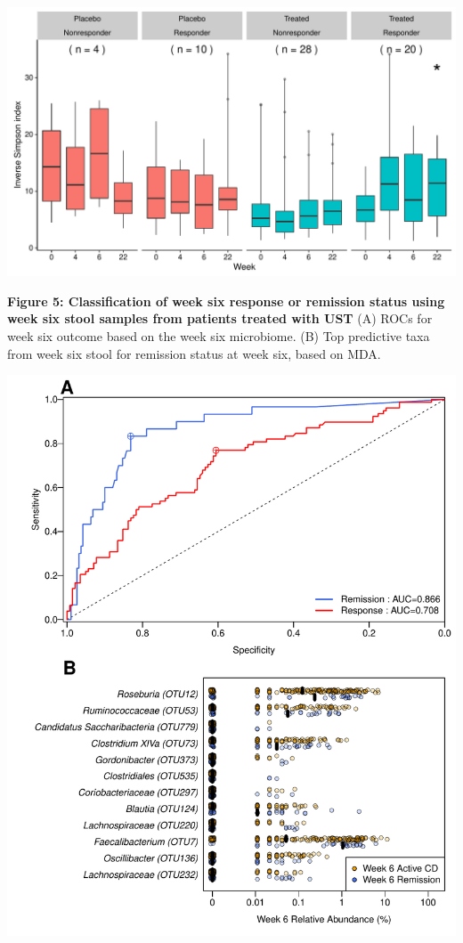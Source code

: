 \documentclass[11pt,]{article}
\begin{document}
\includegraphics{figures/Figure4_alltp.adivXvisitXindtrtXrelRSPwk22.pdf}

\newpage

\textbf{Figure 5: Classification of week six response or remission
status using week six stool samples from patients treated with UST} (A)
ROCs for week six outcome based on the week six microbiome. (B) Top
predictive taxa from week six stool for remission status at week six,
based on MDA.

\includegraphics{figures/Figure5_wk6Xwk6.pdf}
\end{document}
